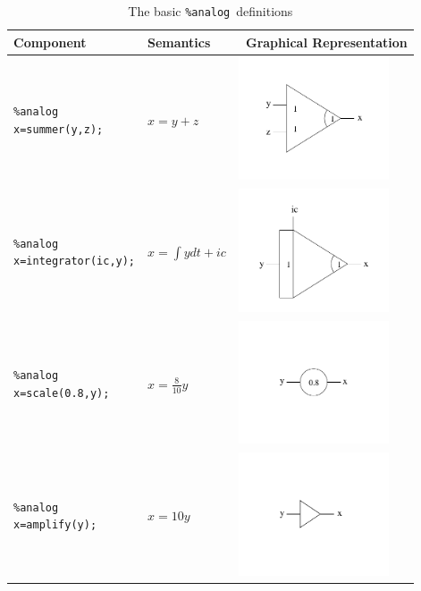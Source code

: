 \documentclass[a4paper,10pt]{article}
\newcommand{\analog}{\texttt{\%analog}}
\begin{document}
\begin{table}
\label{basicComponents}
\begin{center}
\begin{tabular}{|m{40mm}|m{34mm}|m{12em}|}
\hline 
\centering Component&\centering Semantics & \ Graphical Representation\\
\hline
\hline
\centering
\begin{verbatim}
%analog
x=summer(y,z);
\end{verbatim}
  & \centering \large $x = y + z$ &  \includegraphics[width=12em]{summer}\\
\hline
\centering
\begin{verbatim}
%analog
x=integrator(ic,y);
\end{verbatim}
 & \centering \large $x= \int y dt + ic$ & \includegraphics[width=12em]{integrator}\\
\hline
\centering
\begin{verbatim}
%analog
x=scale(0.8,y);
\end{verbatim}
 &  \centering \large $x= \frac{8}{10}y$ & \includegraphics[width=12em]{pot}\\
 \hline
\centering
\begin{verbatim}
%analog
x=amplify(y);
\end{verbatim}
 &  \centering \large $x= 10y$ & \includegraphics[width=12em]{amplify}\\
\hline
\end{tabular}
\end{center}
\caption{The basic \analog\ definitions}
\end{table}
\end{document}
